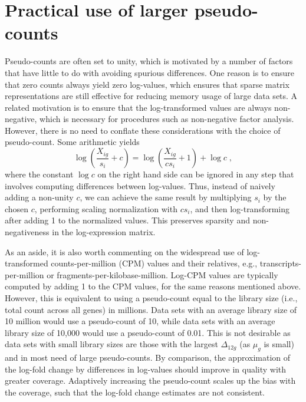 \documentclass[10pt,letterpaper]{article}
\begin{document}
\section{Practical use of larger pseudo-counts}
Pseudo-counts are often set to unity, which is motivated by a number of factors that have little to do with avoiding spurious differences.
One reason is to ensure that zero counts always yield zero log-values, which ensures that sparse matrix representations are still effective for reducing memory usage of large data sets.
A related motivation is to ensure that the log-transformed values are always non-negative, which is necessary for procedures such as non-negative factor analysis.
However, there is no need to conflate these considerations with the choice of pseudo-count.
Some arithmetic yields 
\[
 \log\left(\frac{X_{ig}}{s_i}+ c\right) = \log\left(\frac{X_{ig}}{cs_i}+ 1\right) + \log c \;,
\]
where the constant $\log c$ on the right hand side can be ignored in any step that involves computing differences between log-values.
Thus, instead of naively adding a non-unity $c$, we can achieve the same result by multiplying $s_i$ by the chosen $c$, performing scaling normalization with $cs_i$, and then log-transforming after adding 1 to the normalized values.
This preserves sparsity and non-negativeness in the log-expression matrix.

As an aside, it is also worth commenting on the widespread use of log-transformed counts-per-million (CPM) values and their relatives, e.g., transcripts-per-million or fragments-per-kilobase-million.
Log-CPM values are typically computed by adding 1 to the CPM values, for the same reasons mentioned above.
However, this is equivalent to using a pseudo-count equal to the library size (i.e., total count across all genes) in millions.
Data sets with an average library size of 10 million would use a pseudo-count of 10, while data sets with an average library size of 10,000 would use a pseudo-count of 0.01.
This is not desirable as data sets with small library sizes are those with the largest $\Delta_{12g}$ (as $\mu_g$ is small) and in most need of large pseudo-counts.
By comparison, the approximation of the log-fold change by differences in log-values should improve in quality with greater coverage.
Adaptively increasing the pseudo-count scales up the bias with the coverage, such that the log-fold change estimates are not consistent.
\end{document}
